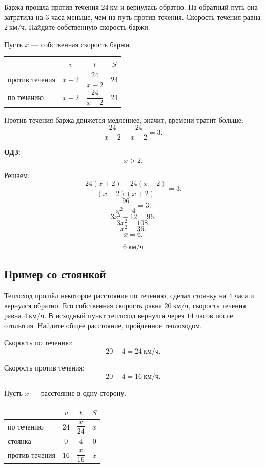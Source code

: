 \documentclass[a4paper,12pt]{article}
\newcommand{\important}[1]{\textcolor{darkaccent}{\textbf{#1}}}
\newcommand{\kmh}{\text{км/ч}}
\newcommand{\km}{\text{км}}
\begin{document}
Баржа прошла против течения $24\ \km$ и вернулась обратно. На обратный путь она затратила на $3$ часа меньше, чем на путь против течения. Скорость течения равна $2\ \kmh$. Найдите собственную скорость баржи.

Пусть $x$ --- собственная скорость баржи.

\begin{center}
\renewcommand{\arraystretch}{1.35}
\begin{tabularx}{0.82\linewidth}{X c c c}
\toprule
 & $v$ & $t$ & $S$ \\
\midrule
против течения & $x-2$ & $\dfrac{24}{x-2}$ & $24$ \\
по течению & $x+2$ & $\dfrac{24}{x+2}$ & $24$ \\
\bottomrule
\end{tabularx}
\end{center}

Против течения баржа движется медленнее, значит, времени тратит больше:
\[
\frac{24}{x-2}-\frac{24}{x+2}=3.
\]

\important{ОДЗ:}
\[
x>2.
\]

Решаем:
\[
\frac{24(x+2)-24(x-2)}{(x-2)(x+2)}=3.
\]
\[
\frac{96}{x^2-4}=3.
\]
\[
3x^2-12=96.
\]
\[
3x^2=108.
\]
\[
x^2=36.
\]
\[
x=6.
\]

\[
\boxed{6\ \kmh}
\]

\subsection{Пример со стоянкой}

Теплоход прошёл некоторое расстояние по течению, сделал стоянку на $4$ часа и вернулся обратно. Его собственная скорость равна $20\ \kmh$, скорость течения равна $4\ \kmh$. В исходный пункт теплоход вернулся через $14$ часов после отплытия. Найдите общее расстояние, пройденное теплоходом.

Скорость по течению:
\[
20+4=24\ \kmh.
\]

Скорость против течения:
\[
20-4=16\ \kmh.
\]

Пусть $x$ --- расстояние в одну сторону.

\begin{center}
\renewcommand{\arraystretch}{1.35}
\begin{tabularx}{0.82\linewidth}{X c c c}
\toprule
 & $v$ & $t$ & $S$ \\
\midrule
по течению & $24$ & $\dfrac{x}{24}$ & $x$ \\
стоянка & $0$ & $4$ & $0$ \\
против течения & $16$ & $\dfrac{x}{16}$ & $x$ \\
\bottomrule
\end{tabularx}
\end{center}
\end{document}
